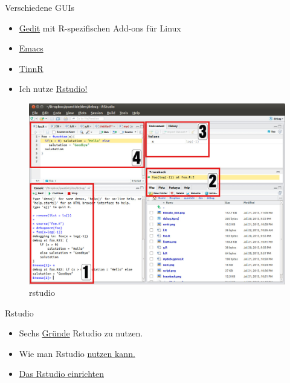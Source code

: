 \documentclass[
  ignorenonframetext,
]{beamer}
\begin{document}
\begin{frame}{Verschiedene GUIs}
\protect\hypertarget{verschiedene-guis}{}

\begin{itemize}
\item
  \href{https://projects.gnome.org/gedit/}{Gedit} mit R-spezifischen
  Add-ons für Linux
\item
  \href{http://www.gnu.org/software/emacs/}{Emacs}
\item
  \href{http://www.sciviews.org/Tinn-R/}{TinnR}
\item
  Ich nutze \href{https://www.rstudio.com/}{Rstudio!}
\end{itemize}

\begin{figure}
\centering
\includegraphics{figure/0_overall.jpg}
\caption{rstudio}
\end{figure}

\end{frame}

\begin{frame}{Rstudio}
\protect\hypertarget{rstudio}{}

\begin{itemize}
\item
  Sechs
  \href{http://www.r-bloggers.com/top-6-reasons-you-need-to-be-using-rstudio/}{Gründe}
  Rstudio zu nutzen.
\item
  Wie man Rstudio
  \href{https://support.rstudio.com/hc/en-us/sections/200107586-Using-RStudio}{nutzen
  kann.}
\item
  \href{https://support.rstudio.com/hc/en-us/articles/200549016-Customizing-RStudio}{Das
  Rstudio einrichten}
\end{itemize}

\end{frame}
\end{document}
